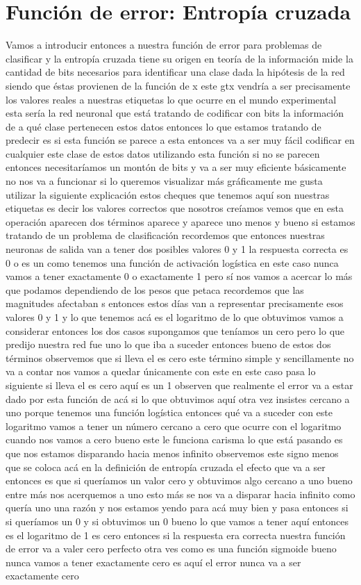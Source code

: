 \section{Función de error: Entropía cruzada}
Vamos a introducir entonces a nuestra función de error para problemas de clasificar y la entropía cruzada tiene su origen en teoría de la información mide la cantidad de bits necesarios para identificar una clase dada la hipótesis de la red siendo que éstas provienen de la función de x este gtx vendría a ser precisamente los valores reales a nuestras etiquetas lo que ocurre en el mundo experimental esta sería la red neuronal que está tratando de codificar con bits la información de a qué clase pertenecen estos datos entonces lo que estamos tratando de predecir es si esta función se parece a esta entonces va a ser muy fácil codificar en cualquier este clase de estos datos utilizando esta función si no se parecen entonces necesitaríamos un montón de bits y va a ser muy eficiente básicamente no nos va a funcionar si lo queremos visualizar más gráficamente me gusta utilizar la siguiente explicación estos cheques que tenemos aquí son nuestras etiquetas es decir los valores correctos que nosotros creíamos vemos que en esta operación aparecen dos términos aparece y aparece uno menos y bueno si estamos tratando de un problema de clasificación recordemos que entonces nuestras neuronas de salida van a tener dos posibles valores 0 y 1 la respuesta correcta es 0 o es un como tenemos una función de activación logística en este caso nunca vamos a tener exactamente 0 o exactamente 1 pero sí nos vamos a acercar lo más que podamos dependiendo de los pesos que petaca recordemos que las magnitudes afectaban s entonces estos días van a representar precisamente esos valores 0 y 1 y lo que tenemos acá es el logaritmo de lo que obtuvimos vamos a considerar entonces los dos casos supongamos que teníamos un cero pero lo que predijo nuestra red fue uno lo que iba a suceder entonces bueno de estos dos términos observemos que si lleva el es cero este término simple y sencillamente no va a contar nos vamos a quedar únicamente con este en este caso pasa lo siguiente si lleva el es cero aquí es un 1 observen que realmente el error va a estar dado por esta función de acá si lo que obtuvimos aquí otra vez insistes cercano a uno porque tenemos una función logística entonces qué va a suceder con este logaritmo vamos a tener un número cercano a cero que ocurre con el logaritmo cuando nos vamos a cero bueno este le funciona carisma lo que está pasando es que nos estamos disparando hacia menos infinito observemos este signo menos que se coloca acá en la definición de entropía cruzada el efecto que va a ser entonces es que si queríamos un valor cero y obtuvimos algo cercano a uno bueno entre más nos acerquemos a uno esto más se nos va a disparar hacia infinito como quería uno una razón y nos estamos yendo para acá muy bien y pasa entonces si si queríamos un 0 y si obtuvimos un 0 bueno lo que vamos a tener aquí entonces es el logaritmo de 1 es cero entonces si la respuesta era correcta nuestra función de error va a valer cero perfecto otra ves como es una función sigmoide bueno nunca vamos a tener exactamente cero es aquí el error nunca va a ser exactamente cero 